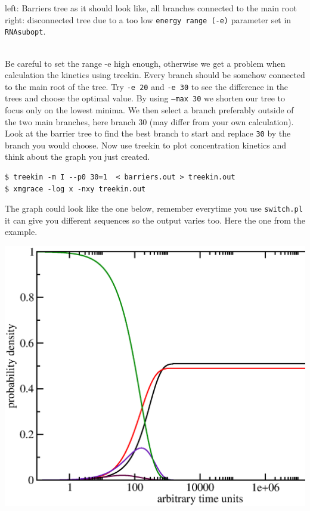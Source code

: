 \documentclass[a4paper]{article}
\begin{document}
\begin{tiny}
left: Barriers tree as it should look like, all branches connected to the main root
right: disconnected tree due to a too low \texttt{energy range (-e)} parameter set in \texttt{RNAsubopt}.
\end{tiny}\\

Be careful to set the range -e high enough, otherwise we get a problem when calculation 
the kinetics using treekin. Every branch should be somehow connected to the main root of the tree.
Try \texttt{-e 20} and \texttt{-e 30} to see the 
difference in the trees and choose the optimal value. By using \texttt{--max 30} we 
shorten our tree to focus only on the lowest minima.
We then select a branch preferably outside of the two main branches, here branch 30 (may differ from your own
calculation). Look at the barrier tree to find the best branch to start and replace \texttt{30} by the
branch you would choose. Now use treekin to plot concentration kinetics and think about the graph you
just created.
\begin{verbatim}
$ treekin -m I --p0 30=1  < barriers.out > treekin.out
$ xmgrace -log x -nxy treekin.out
\end{verbatim}
The graph could look like the one below, remember everytime you use \texttt{switch.pl} it can give you different
sequences so the output varies too. Here the one from the example.
\begin{center}
\includegraphics[trim=0cm 1.5cm 0cm -2.5cm, width=.45\textheight]{Figures/switch_treekin.eps}\\
\end{center}
\pagebreak[3]
\end{document}
